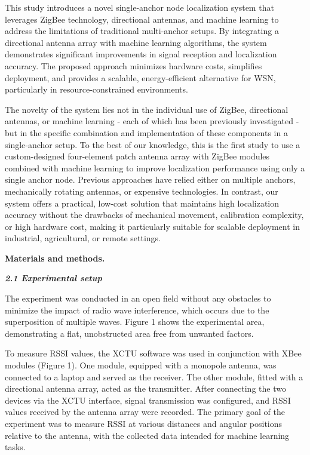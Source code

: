 This study introduces a novel single-anchor node localization system
that leverages ZigBee technology, directional antennas, and machine
learning to address the limitations of traditional multi-anchor setups.
By integrating a directional antenna array with machine learning
algorithms, the system demonstrates significant improvements in signal
reception and localization accuracy. The proposed approach minimizes
hardware costs, simplifies deployment, and provides a scalable,
energy-efficient alternative for WSN, particularly in
resource-constrained environments.

The novelty of the system lies not in the individual use of ZigBee,
directional antennas, or machine learning - each of which has been
previously investigated - but in the specific combination and
implementation of these components in a single-anchor setup. To the best
of our knowledge, this is the first study to use a custom-designed
four-element patch antenna array with ZigBee modules combined with
machine learning to improve localization performance using only a single
anchor node. Previous approaches have relied either on multiple anchors,
mechanically rotating antennas, or expensive technologies. In contrast,
our system offers a practical, low-cost solution that maintains high
localization accuracy without the drawbacks of mechanical movement,
calibration complexity, or high hardware cost, making it particularly
suitable for scalable deployment in industrial, agricultural, or remote
settings.

{\bfseries Materials and methods.}

\emph{{\bfseries 2.1 Experimental setup}}

The experiment was conducted in an open field without any obstacles to
minimize the impact of radio wave interference, which occurs due to the
superposition of multiple waves. Figure 1 shows the experimental area,
demonstrating a flat, unobstructed area free from unwanted factors.

To measure RSSI values, the XCTU software was used in conjunction with
XBee modules (Figure 1). One module, equipped with a monopole antenna,
was connected to a laptop and served as the receiver. The other module,
fitted with a directional antenna array, acted as the transmitter. After
connecting the two devices via the XCTU interface, signal transmission
was configured, and RSSI values received by the antenna array were
recorded. The primary goal of the experiment was to measure RSSI at
various distances and angular positions relative to the antenna, with
the collected data intended for machine learning tasks.


